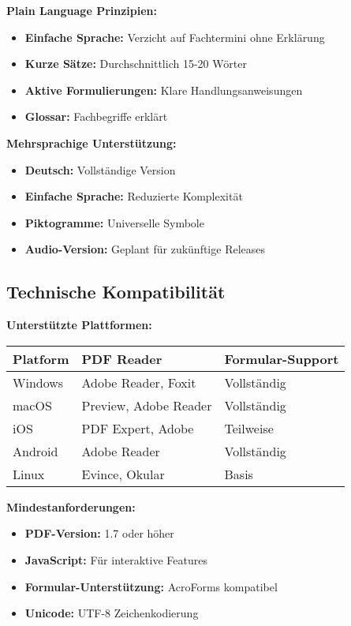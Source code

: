 \begin{ctmmOrangeBox}[title=Verständliche Kommunikation]

\textbf{Plain Language Prinzipien:}
\begin{itemize}
    \item \textbf{Einfache Sprache:} Verzicht auf Fachtermini ohne Erklärung
    \item \textbf{Kurze Sätze:} Durchschnittlich 15-20 Wörter
    \item \textbf{Aktive Formulierungen:} Klare Handlungsanweisungen
    \item \textbf{Glossar:} Fachbegriffe erklärt
\end{itemize}

\textbf{Mehrsprachige Unterstützung:}
\begin{itemize}
    \item \textbf{Deutsch:} Vollständige Version
    \item \textbf{Einfache Sprache:} Reduzierte Komplexität
    \item \textbf{Piktogramme:} Universelle Symbole
    \item \textbf{Audio-Version:} Geplant für zukünftige Releases
\end{itemize}

\end{ctmmOrangeBox}

\subsection{Technische Kompatibilität}

\begin{ctmmPurpleBox}[title=Geräte- und Software-Unterstützung]

\textbf{Unterstützte Plattformen:}
\begin{tabular}{|l|l|l|}
\hline
\textbf{Platform} & \textbf{PDF Reader} & \textbf{Formular-Support} \\
\hline
Windows & Adobe Reader, Foxit & Vollständig \\
\hline
macOS & Preview, Adobe Reader & Vollständig \\
\hline
iOS & PDF Expert, Adobe & Teilweise \\
\hline
Android & Adobe Reader & Vollständig \\
\hline
Linux & Evince, Okular & Basis \\
\hline
\end{tabular}

\textbf{Mindestanforderungen:}
\begin{itemize}
    \item \textbf{PDF-Version:} 1.7 oder höher
    \item \textbf{JavaScript:} Für interaktive Features
    \item \textbf{Formular-Unterstützung:} AcroForms kompatibel
    \item \textbf{Unicode:} UTF-8 Zeichenkodierung
\end{itemize}

\end{ctmmPurpleBox}

